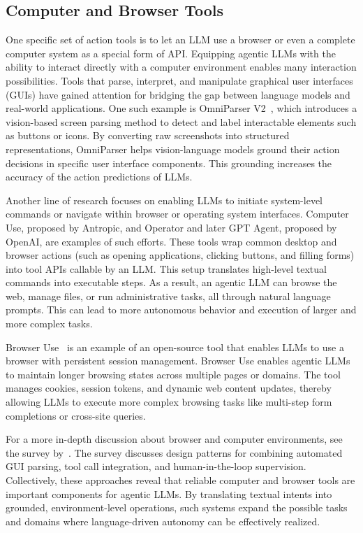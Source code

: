 
\subsection{Computer and Browser Tools}
\label{sec:computer_browser_tools}

One specific set of action tools is to let an LLM use a browser or even a complete computer system as a special form of API. Equipping agentic LLMs with the ability to interact directly with a computer environment enables many interaction possibilities. Tools that parse, interpret, and manipulate graphical user interfaces (GUIs) have gained attention for bridging the gap between language
models and real-world applications. One such example is OmniParser V2~\citep{lu2024omniparserpurevisionbased}, which introduces a vision-based screen parsing method
to detect and label interactable elements such as buttons or icons. By converting raw screenshots into structured representations, OmniParser helps vision-language
models ground their action decisions in specific user interface components. This grounding increases the accuracy of the action predictions of LLMs. 

Another line of research focuses on enabling LLMs to initiate system-level commands or navigate within browser or operating system interfaces.
Computer Use, proposed by Antropic, and Operator and later GPT Agent, proposed by OpenAI, are examples of such efforts. These tools wrap common desktop and browser actions (such as opening applications, clicking buttons, and filling forms) into tool APIs callable by an LLM. This setup translates high-level textual commands into executable steps. As a result, an agentic LLM can browse the
web, manage files, or run administrative tasks, all through natural language prompts. This can lead to more autonomous behavior and execution of larger and more complex tasks. 

Browser Use~\citep{browser_use2024} is an example of an open-source tool that enables LLMs to use a browser with persistent session management. Browser Use enables agentic LLMs to maintain longer browsing states across multiple pages or domains. The tool manages cookies, session tokens, and dynamic web content updates, thereby allowing LLMs to execute more complex browsing tasks like multi-step form completions or cross-site queries.

For a more in-depth discussion about browser and computer environments, see the survey by~\citet{wang2025guiagentsfoundationmodels}. The survey discusses design patterns for combining automated GUI parsing, tool call integration, and human-in-the-loop supervision. Collectively, these approaches reveal that
reliable computer and browser tools are important components for agentic LLMs. By translating textual intents into grounded, environment-level operations, such systems expand the possible tasks and domains where language-driven autonomy can be effectively realized.



